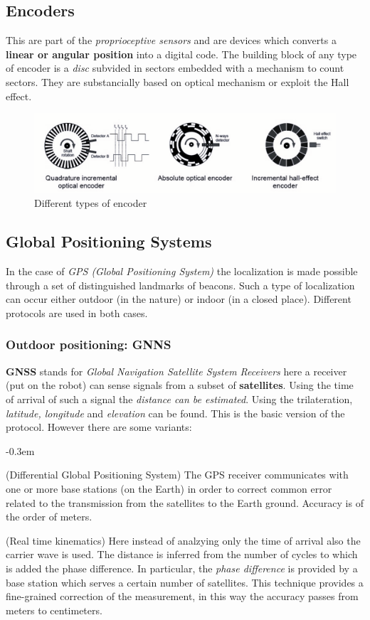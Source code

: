 \subsection{Encoders}
This are part of the \textit{proprioceptive sensors} and are devices which converts a \textbf{linear or angular position} into a digital code. The building block of any type of encoder is a \textit{disc} subvided in sectors embedded with a mechanism to count sectors. They are substancially based on optical mechanism or exploit the Hall effect.

\begin{figure}
    \centering
    \includegraphics[scale=0.7]{img/sens_encoder.png}
    \caption{Different types of encoder}
\end{figure}

\subsection{Global Positioning Systems}
In the case of \textit{GPS (Global Positioning System)} the localization is made possible through a set of distinguished landmarks of beacons. Such a type of localization can occur either outdoor (in the nature) or indoor (in a closed place). Different protocols are used in both cases.

\subsubsection{Outdoor positioning: GNNS}
\textbf{GNSS} stands for \textit{Global Navigation Satellite System Receivers} here a receiver (put on the robot) can sense signals from a subset of \textbf{satellites}. Using the time of arrival of such a signal the \textit{distance can be estimated}. Using the trilateration, \textit{latitude, longitude} and \textit{elevation} can be found. This is the basic version of the protocol. However there are some variants: 
\begin{description}
    \itemsep-0.3em
    \item[DPGS] (Differential Global Positioning System) The GPS receiver communicates with one or more base stations (on the Earth)  in order to correct common error related to the transmission from the satellites to the Earth ground. Accuracy is of the order of meters.
    \item[RTK] (Real time kinematics) Here instead of analzying only the time of  arrival also the carrier wave is used. The distance is inferred from the number of cycles to which is added the phase difference. In particular, the  \textit{phase difference} is provided by a base station which serves a certain number of satellites. This technique provides a fine-grained correction of the measurement, in this way the accuracy passes from meters to centimeters.
\end{description}

